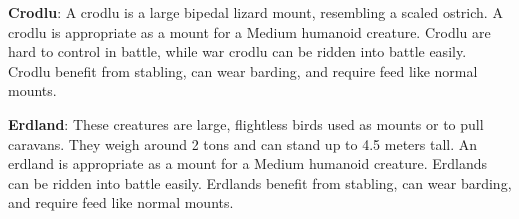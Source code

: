 
\textbf{Crodlu}: A crodlu is a large bipedal lizard mount, resembling a scaled ostrich. A crodlu is appropriate as a mount for a Medium humanoid creature. Crodlu are hard to control in battle, while war crodlu can be ridden into battle easily. Crodlu benefit from stabling, can wear barding, and require feed like normal mounts.

\textbf{Erdland}: These creatures are large, flightless birds used as mounts or to pull caravans. They weigh around 2 tons and can stand up to 4.5 meters tall. An erdland is appropriate as a mount for a Medium humanoid creature. Erdlands can be ridden into battle easily. Erdlands benefit from stabling, can wear barding, and require feed like normal mounts.

